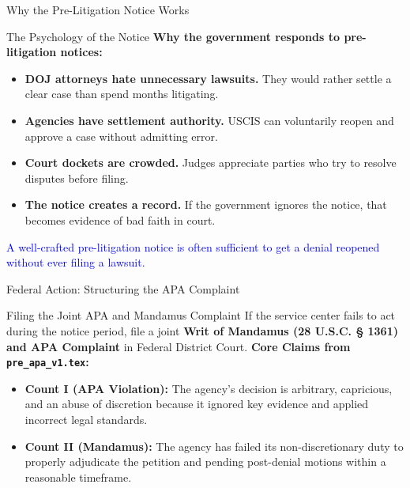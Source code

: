 \documentclass[11pt]{beamer}
\begin{document}
	\begin{frame}{Why the Pre-Litigation Notice Works}
		\scriptsize
		\begin{block}{The Psychology of the Notice}
			\textbf{Why the government responds to pre-litigation notices:}
			\begin{itemize}
				\item \textbf{DOJ attorneys hate unnecessary lawsuits.} They would rather settle a clear case than spend months litigating.
				\item \textbf{Agencies have settlement authority.} USCIS can voluntarily reopen and approve a case without admitting error.
				\item \textbf{Court dockets are crowded.} Judges appreciate parties who try to resolve disputes before filing.
				\item \textbf{The notice creates a record.} If the government ignores the notice, that becomes evidence of bad faith in court.
			\end{itemize}
			\textcolor{blue}{A well-crafted pre-litigation notice is often sufficient to get a denial reopened without ever filing a lawsuit.}
		\end{block}
	\end{frame}
	
	\begin{frame}{Federal Action: Structuring the APA Complaint}
		\scriptsize
		\begin{block}{Filing the Joint APA and Mandamus Complaint}
			If the service center fails to act during the notice period, file a joint \textbf{Writ of Mandamus (28 U.S.C. § 1361) and APA Complaint} in Federal District Court.
			\vspace{0.1cm}
			\textbf{Core Claims from \texttt{pre\_apa\_v1.tex}:}
			\begin{itemize}
				\item \textbf{Count I (APA Violation):} The agency's decision is arbitrary, capricious, and an abuse of discretion because it ignored key evidence and applied incorrect legal standards.
				\item \textbf{Count II (Mandamus):} The agency has failed its non-discretionary duty to properly adjudicate the petition and pending post-denial motions within a reasonable timeframe.
			\end{itemize}
		\end{block}
	\end{frame}
	
	
\end{document}

